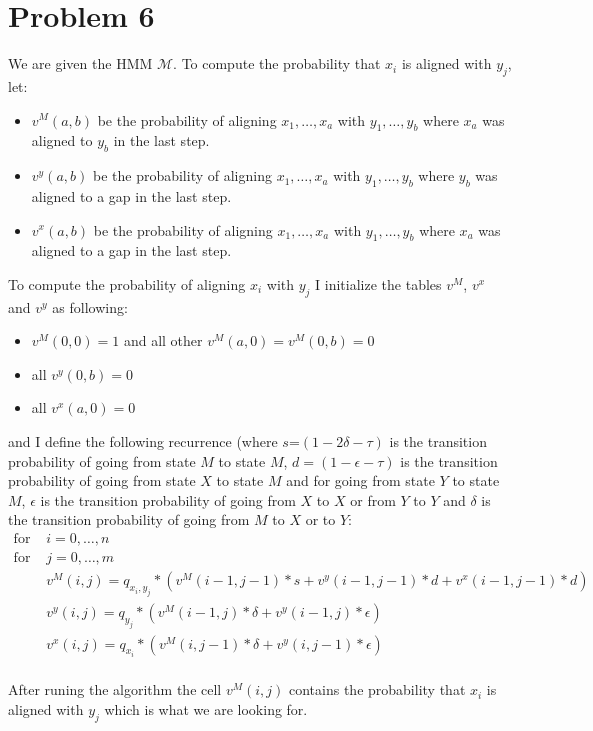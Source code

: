 \documentclass[a4paper]{article}
\begin{document}
\section{Problem 6}
We are given the HMM $\mathcal{M}$. To compute the probability that $x_i$ is aligned with $y_j$, let:
\begin{itemize}
\item $v^M(a,b)$ be the probability of aligning $x_1,\hdots, x_a$ with $y_1,\hdots, y_b$ where $x_a$ was aligned to $y_b$ in the last step.
\item $v^y(a,b)$ be the probability of aligning $x_1,\hdots, x_a$ with $y_1,\hdots, y_b$ where $y_b$ was aligned to a gap in the last step.
\item $v^x(a,b)$ be the probability of aligning $x_1,\hdots, x_a$ with $y_1,\hdots, y_b$ where $x_a$ was aligned to a gap in the last step.
\end{itemize}
To compute the probability of aligning $x_i$ with $y_j$ I initialize the tables $v^M$, $v^x$ and $v^y$ as following:
\begin{itemize}
\item$v^M(0,0)=1$ and all other $v^M(a,0)=v^M(0,b)=0$
\item all $v^y(0,b)=0$
\item all $v^x(a,0)=0$
\end{itemize}
and I define the following recurrence (where $s$=$(1-2\delta-\tau)$ is the transition probability of going from state $M$ to state $M$, $d=(1-\epsilon-\tau)$ is the transition probability of going from state $X$ to state $M$ and for going from state $Y$ to state $M$, $\epsilon$ is the transition probability of going from $X$ to $X$ or from $Y$ to $Y$ and $\delta$ is the transition probability of going from $M$ to $X$ or to $Y$:\\

\begin{align*}
\text{for }&i=0,\hdots,n\\
\text{for }&j=0,\hdots,m\\
     &v^M(i,j)=q_{x_i,y_j}*(v^M(i-1,j-1)*s+v^y(i-1,j-1)*d+v^x(i-1,j-1)*d)\\
     &v^y(i,j)=q_{y_j}*(v^M(i-1,j)*\delta+v^y(i-1,j)*\epsilon)\\
    &v^x(i,j)=q_{x_i}*(v^M(i,j-1)*\delta+v^y(i,j-1)*\epsilon)\\	
 \end{align*}
 
 After runing the algorithm the cell $v^M(i,j)$ contains the probability that $x_i$ is aligned with $y_j$ which is what we are looking for.
\end{document}

